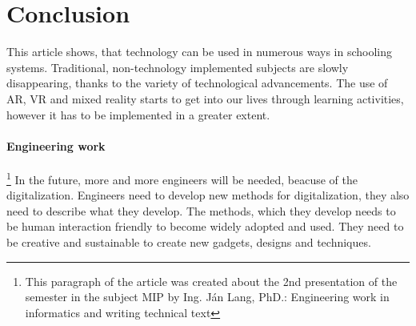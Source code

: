 \documentclass[10pt,oneside,english,a4paper]{article}
\begin{document}
\section{Conclusion}

	This article shows, that technology can be used in numerous ways in schooling systems. Traditional, non-technology implemented subjects are slowly disappearing, thanks to the variety of technological advancements. The use of AR, VR and mixed reality starts to get into our lives through learning activities, however it has to be implemented in a greater extent.

\paragraph{Engineering work}\footnote{This paragraph of the article was created about the 2nd presentation of the semester in the subject MIP by Ing. Ján Lang, PhD.: Engineering work in informatics and writing technical text} In the future, more and more engineers will be needed, beacuse of the digitalization. Engineers need to develop new methods for digitalization, they also need to describe what they develop. The methods, which they develop needs to be human interaction friendly to become widely adopted and used. They need to be creative and sustainable to create new gadgets, designs and techniques.





\end{document}

